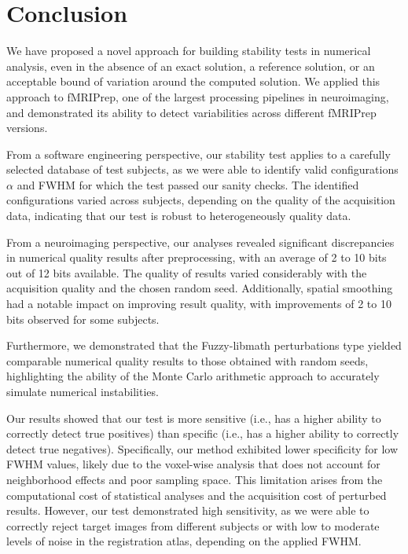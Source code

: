 \documentclass[lettersize,journal]{IEEEtran}
\newcommand{\fmriprep}{fMRIPrep\xspace}
\begin{document}
\section{Conclusion}

We have proposed a novel approach for building stability tests in numerical analysis, even in the absence of an exact solution, a reference solution, or an acceptable bound of variation around the computed solution. We applied this approach to \fmriprep, one of the largest processing pipelines in neuroimaging, and demonstrated its ability to detect variabilities across different \fmriprep versions.

From a software engineering perspective, our stability test applies to a carefully selected database of test subjects, as we were able to identify valid configurations $\alpha$ and FWHM for which the test passed our sanity checks. The identified configurations varied across subjects, depending on the quality of the acquisition data, indicating that our test is robust to heterogeneously quality data.

From a neuroimaging perspective, our analyses revealed significant discrepancies in numerical quality results after preprocessing, with an average of 2 to 10 bits out of 12 bits available. The quality of results varied considerably with the acquisition quality and the chosen random seed. Additionally, spatial smoothing had a notable impact on improving result quality, with improvements of 2 to 10 bits observed for some subjects.

Furthermore, we demonstrated that the Fuzzy-libmath perturbations type yielded comparable numerical quality results to those obtained with random seeds, highlighting the ability of the Monte Carlo arithmetic approach to accurately simulate numerical instabilities.

Our results showed that our test is more sensitive (i.e., has a higher ability to correctly detect true positives) than specific (i.e., has a higher ability to correctly detect true negatives). Specifically, our method exhibited lower specificity for low FWHM values, likely due to the voxel-wise analysis that does not account for neighborhood effects and poor sampling space. This limitation arises from the computational cost of statistical analyses and the acquisition cost of perturbed results. However, our test demonstrated high sensitivity, as we were able to correctly reject target images from different subjects or with low to moderate levels of noise in the registration atlas, depending on the applied FWHM.
\end{document}
